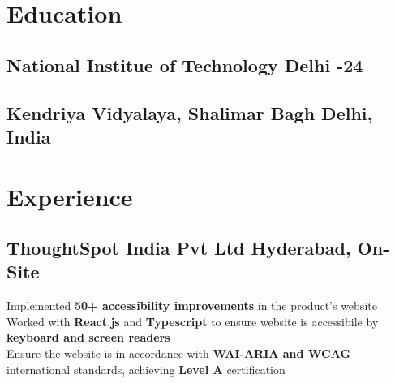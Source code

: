 \documentclass[]{Nikhil_Kadiyan_Resume}
\begin{document}

\descript{}

\section{Education}
\hrulefill

\subsection{National Institue of Technology Delhi \hfill {}-24}

\sectionsep

\subsection{Kendriya Vidyalaya, Shalimar Bagh \hfill \normalfont Delhi, India}

\sectionsep

\section{Experience} 
\hrulefill

\subsection{ThoughtSpot India Pvt Ltd \hfill \normalfont Hyderabad, On-Site}
\pt Implemented \textbf{50+ accessibility improvements} in the product's website\\
\pt Worked with \textbf{React.js} and \textbf{Typescript} to ensure website is accessibile by \textbf{keyboard and screen readers}\\
\pt Ensure the website is in accordance with \textbf{WAI-ARIA and WCAG} international standards, achieving \textbf{Level A} certification\\
\sectionsep
\end{document}

